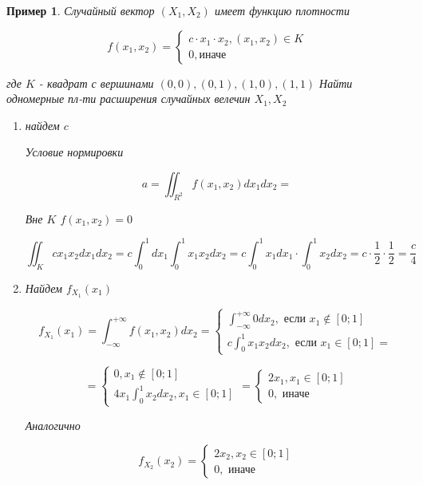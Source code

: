 \documentclass[a4paper, 14pt]{report}
\newtheorem{example}{Пример}[section]
\begin{document}
\begin{example}
    Случайный вектор $(X_1, X_2)$ имеет функцию плотности

    $$
    f(x_1, x_2) =
    \begin{cases}
        c \cdot x_1 \cdot x_2, (x_1, x_2) \in K \\
        0, \text{иначе}
    \end{cases}
    $$

    где $K$ - квадрат с вершинами $(0,0), (0,1), (1,0), (1,1)$ Найти одномерные пл-ти расширения случайных велечин $X_1, X_2$

    \begin{enumerate}
        \item найдем $c$

            Условие нормировки

            $$
            a = \iint_{R^2} f(x_1, x_2) dx_1 dx_2 =
            $$

            Вне $K$ $f(x_1, x_2) = 0$

            $$
            \iint_K cx_1x_2dx_1dx_2 = c \int_0^1 dx_1 \int_0^1 x_1x_2dx_2 = c \int_0^1 x_1dx_1 \cdot \int_0^1 x_2 dx_2 = c\cdot \frac{1}{2} \cdot \frac{1}{2} = \frac{c}{4}
            $$

        \item Найдем $f_{X_1}(x_1)$

            $$
            f_{X_1}(x_1) = \int_{-\infty}^{+\infty} f(x_1, x_2)dx_2 =
            \begin{cases}
                \int_{-\infty}^{+\infty} 0dx_2, \text{ если } x_1 \nin [0;1] \\
                c \int_0^1 x_1x_2dx_2, \text{ если } x_1 \in [0;1] =
            \end{cases}
            $$

            $$
            =
            \begin{cases}
                0, x_1 \nin [0;1] \\
                4x_1 \int_0^1 x_2 dx_2, x_1 \in [0;1]
            \end{cases}
            =
            \begin{cases}
                2x_1, x_1 \in [0;1] \\
                0, \text{ иначе}
            \end{cases}
            $$

            Аналогично

            $$
            f_{X_2}(x_2) =
            \begin{cases}
                2x_2, x_2 \in [0;1] \\
                0, \text{ иначе}
            \end{cases}
            $$
    \end{enumerate}
\end{example}
\end{document}
